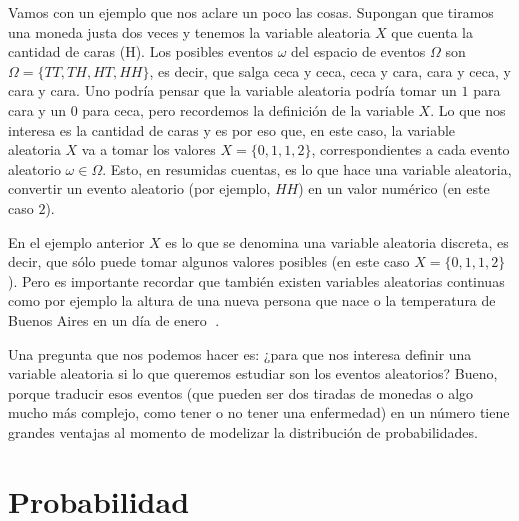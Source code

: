 \documentclass[
  letterpaper,
  DIV=11,
  numbers=noendperiod,
  oneside]{scrreprt}
\begin{document}
Vamos con un ejemplo que nos aclare un poco las cosas. Supongan que
tiramos una moneda justa dos veces y tenemos la variable aleatoria
\(X\) que cuenta la cantidad de caras (H).
Los posibles eventos \(\omega\) del espacio de eventos \(\Omega\) son
\(\Omega = \{ TT, TH, HT, HH \}\), es decir, que salga ceca y ceca, ceca
y cara, cara y ceca, y cara y cara. Uno podría pensar que la variable
aleatoria podría tomar un \(1\) para cara y un \(0\) para ceca, pero
recordemos la definición de la variable \(X\). Lo que nos interesa es la
cantidad de caras y es por eso que, en este caso, la variable aleatoria
\(X\) va a tomar los valores \(X = \{ 0, 1, 1, 2\}\), correspondientes a
cada evento aleatorio \(\omega \in \Omega\). Esto, en resumidas cuentas,
es lo que hace una variable aleatoria, convertir un evento aleatorio
(por ejemplo, \(HH\)) en un valor numérico (en este caso \(2\)).

En el ejemplo anterior \(X\) es lo que se denomina una variable
aleatoria discreta, es decir, que sólo puede tomar algunos valores
posibles (en este caso \(X = \{ 0, 1, 1, 2\}\)). Pero es importante
recordar que también existen variables aleatorias continuas como por
ejemplo la altura de una nueva persona que nace o la temperatura de
Buenos Aires en un día de enero 🥵.

Una pregunta que nos podemos hacer es: ¿para que nos interesa definir
una variable aleatoria si lo que queremos estudiar son los eventos
aleatorios? Bueno, porque traducir esos eventos (que pueden ser dos
tiradas de monedas o algo mucho más complejo, como tener o no tener una
enfermedad) en un número tiene grandes ventajas al momento de modelizar
la distribución de probabilidades.

\hypertarget{probabilidad}{%
\section{Probabilidad}\label{probabilidad}}
\end{document}
